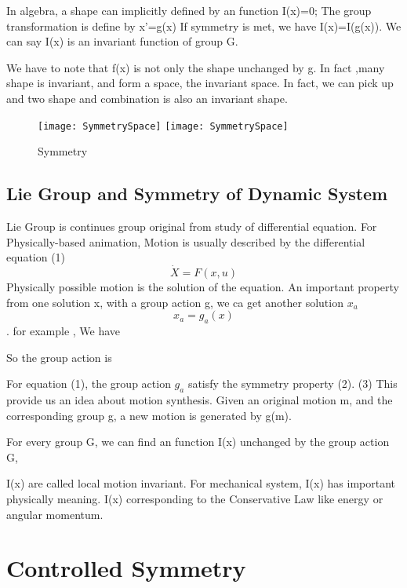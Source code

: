 In algebra, a shape can implicitly defined by an function I(x)=0;
The group transformation is define by x’=g(x)
If symmetry is met, we have I(x)=I(g(x)).
We can say I(x) is an invariant function of group G.

We have to note that f(x) is not only the shape unchanged by g.
In fact ,many shape is invariant, and form a space, the invariant space.
In fact, we can pick up and two shape and combination is also an invariant shape. 


\begin{figure}[!htbp]
  \begin{center}
    \leavevmode
    \ifpdf
      \texttt{[image: SymmetrySpace]}
    \else
      \texttt{[image: SymmetrySpace]}
    \fi
    \caption{Symmetry}
    \label{fig:symmetry}
\end{center}
\end{figure}





\subsection{Lie Group and Symmetry of Dynamic System}
Lie Group is continues group original from study of differential equation.
For Physically-based animation,
Motion is usually described by the differential equation (1)
\begin{equation}
	\dot{X}=F(x,u)
\end{equation}
Physically possible motion is the solution of the equation.
An important property from one solution x, with a group action g, we ca get another solution $x_a$
 	\[
x_a=g_a(x)
\]
.
for example
, 
We have 

So the group action is


For equation (1), the group action $g_a$ satisfy the symmetry property (2).
	(3)
This provide us an idea about motion synthesis.
Given an original motion m, and the corresponding group g, a new motion is generated by g(m).

For every group G, we can find an function I(x) unchanged by the group action G, 

I(x) are called local motion invariant. 
For mechanical system,  I(x) has important physically meaning. 
I(x) corresponding to the Conservative Law like energy or angular momentum.
\section{Controlled Symmetry}

